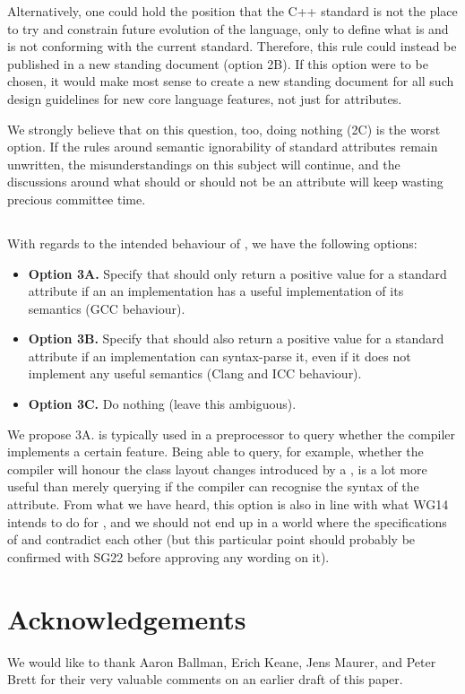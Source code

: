 Alternatively, one could hold the position that the C++ standard is not the place to try and constrain future evolution of the language, only to define what is and is not conforming with the current standard. Therefore, this rule could instead be published in a new standing document (option 2B). If this option were to be chosen, it would make most sense to create a new standing document for all such design guidelines for new core language features, not just for attributes.

We strongly believe that on this question, too, doing nothing (2C) is the worst option. If the rules around semantic ignorability of standard attributes remain unwritten, the misunderstandings on this subject will continue, and the discussions around what should or should not be an attribute will keep wasting precious committee time.

\subsection{}

With regards to the intended behaviour of , we have the following options:

\begin{itemize}
\item \textbf{Option 3A.} Specify that  should only return a positive value for a standard attribute if an an implementation has a useful implementation of its semantics (GCC behaviour).
\item \textbf{Option 3B.} Specify that  should also return a positive value for a standard attribute if an implementation can syntax-parse it, even if it does not implement any useful semantics (Clang and ICC behaviour).
\item \textbf{Option 3C.} Do nothing (leave this ambiguous).
\end{itemize}

We propose 3A.  is typically used in a preprocessor  to query whether the compiler implements a certain feature. Being able to query, for example, whether the compiler will honour the class layout changes introduced by a , is a lot more useful than merely querying if the compiler can recognise the syntax of the attribute. From what we have heard, this option is also in line with what WG14 intends to do for , and we should not end up in a world where the specifications of  and  contradict each other (but this particular point should probably be confirmed with SG22 before approving any wording on it).

\section*{Acknowledgements}
We would like to thank Aaron Ballman, Erich Keane, Jens Maurer, and Peter Brett for their very valuable comments on an earlier draft of this paper.

\renewcommand{\bibname}{References}



